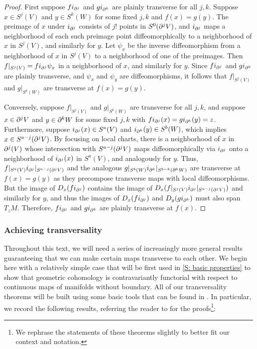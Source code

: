 \begin{proof}
	First suppose $fi_{\partial^j}$ and $gi_{\partial^k}$ are plainly transverse for all $j,k$.
	Suppose $x\in S^j(V)$ and $y\in S^k(W)$ for some fixed $j,k$ and $f(x)=g(y)$.
	The preimage of $x$ under $i_{\partial^j}$ consists of $j!$ points in $S^0(\partial^jV)$, and $i_{\partial^j}$ maps a neighborhood of each such preimage point diffeomorphically to a neighborhood of $x$ in $S^j(V)$, and similarly for $y$.
	Let $\psi_x$ be the inverse diffeomorphism from a neighborhood of $x$ in $S^j(V)$ to a neighborhood of one of the preimages.
	Then $f|_{S^j(V)}=fi_{\partial^j}\psi_x$ in a neighborhood of $x$, and similarly for $y$.
	Since $fi_{\partial^j}$ and $gi_{\partial^k}$ are plainly transverse, and $\psi_x$ and $\psi_y$ are diffeomorphisms, it follows that $f|_{S^j(V)}$ and $g|_{S^k(W)}$ are transverse at $f(x)=g(y)$.

	Conversely, suppose $f|_{S^j(V)}$ and $g|_{S^k(W)}$ are transverse for all $j,k$, and suppose $x\in \partial^jV$ and $y\in \partial^kW$ for some fixed $j,k$ with $fi_{\partial^j}(x)=gi_{\partial^k}(y)=z$.
	Furthermore, suppose $i_{\partial^j}(x)\in S^a(V)$ and $i_{\partial^k}(y)\in S^b(W)$, which implies $x\in S^{a-j}(\partial^j V)$.
	By focusing on local charts, there is a neighborhood of $x$ in $\partial^j(V)$ whose intersection with $S^{a-j}(\partial^j V)$ maps diffeomorphically via $i_{\partial^j}$ onto a neighborhood of $i_{\partial^j}(x)$ in $S^a(V)$, and analogously for $y$.
	Thus, $f|_{S^a(V)}i_{\partial^j}|_{S^{a-j}(\partial^j V)}$ and the analogous $g|_{S^b(W)}i_{\partial^k}|_{S^{b-k}(\partial^k W)}$ are transverse at $f(x)=g(y)$ as they precompose transverse maps with local diffeomorphisms.
	But the image of $D_x(fi_{\partial^j})$ contains the image of $D_x(f|_{S^j(V)}i_{\partial^j}|_{S^{a-j}(\partial^j V)})$ and similarly for $y$, and thus the images of $D_x(fi_{\partial^j})$ and $D_y(gi_{\partial^k})$ must also span $T_{z}M$.
	Therefore, $fi_{\partial^j}$ and $gi_{\partial^k}$ are plainly transverse at $f(x)$.
\end{proof}

\subsubsection{Achieving transversality}

Throughout this text, we will need a series of increasingly more general results guaranteeing that we can make certain maps transverse to each other.
We begin here with a relatively simple case that will be first used in \cref{S: basic properties} to show that geometric cohomology is contravariantly functorial with respect to continuous maps of manifolds without boundary.
All of our transversality theorems will be built using some basic tools that can be found in \cite[Section 2.3]{GuPo74}.
In particular, we record the following results, referring the reader to \cite[Section 2.3]{GuPo74} for the proofs\footnote{We rephrase the statements of these theorems slightly to better fit our context and notation.}:

